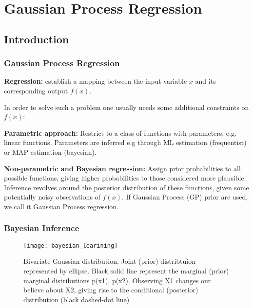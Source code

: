 \documentclass[
	9pt, %
]{beamer}
\begin{document}
\section{Gaussian Process Regression} %

\subsection{Introduction}

\begin{frame}
	\frametitle{Gaussian Process Regression}


	\textbf{Regression:} establish a mapping between the input variable $x$ and its corresponding output $f(x)$.
	\bigskip %

	In order to solve such a problem one usually needs some additional constraints on $f(x)$:

	\bigskip %
	\textbf{Parametric approach:} Restrict to a class of functions with parameters, e.g. linear functions. Parameters
	are inferred e.g through ML estimation (frequentist) or MAP estimation (bayesian).


	\bigskip %
	\textbf{Non-parametric and Bayesian regression:}
	Assign prior probabilities to all possible functions, giving higher probabilities to those considered more plausible.
	Inference revolves around the posterior distribution of these functions,
	given some potentially noisy observations of $f(x)$. If Gaussian Process (GP) prior are used, we call it
	Gaussian Process regression.

\end{frame}


\begin{frame}
	\frametitle{Bayesian Inference}
	\begin{figure}
			\texttt{[image: bayesian\_learining]}
			\caption{Bivariate Gaussian distribution. Joint (prior) distribtuion represented by ellipse. Black solid line
			represent the marginal (prior) marginal distributions p(x1), p(x2). Observing X1 changes our believe about
			X2, giving rise to the conditional (posterior) distribution (black dashed-dot line)}
	\end{figure}

\end{frame}
\end{document}
